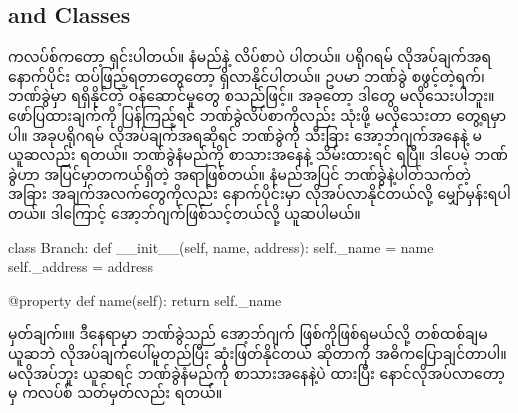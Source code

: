 \subsection*{ and  Classes}
 ကလပ်စ်ကတော့ ရှင်းပါတယ်။ နံမည်နဲ့ လိပ်စာပဲ ပါတယ်။ ပရိုဂရမ် လိုအပ်ချက်အရ နောက်ပိုင်း ထပ်ဖြည့်ရတာတွေတော့ ရှိလာနိုင်ပါတယ်။ ဥပမာ ဘဏ်ခွဲ စဖွင့်တဲ့ရက်၊ ဘဏ်ခွဲမှာ ရရှိနိုင်တဲ့ ဝန်ဆောင်မှုတွေ စသည်ဖြင့်။ အခုတော့ ဒါတွေ မလိုသေးပါဘူး။ ဖော်ပြထားချက်ကို ပြန်ကြည့်ရင် ဘဏ်ခွဲလိပ်စာကိုလည်း သုံးဖို့ မလိုသေးတာ တွေ့ရမှာပါ။ အခုပရိုဂရမ် လိုအပ်ချက်အရဆိုရင် ဘဏ်ခွဲကို သီးခြား အော့ဘ်ဂျက်အနေနဲ့ မယူဆလည်း ရတယ်။ ဘဏ်ခွဲနံမည်ကို စာသားအနေနဲ့ သိမ်းထားရင် ရပြီ။ ဒါပေမဲ့ ဘဏ်ခွဲဟာ အပြင်မှာတကယ်ရှိတဲ့ အရာဖြစ်တယ်။ နံမည်အပြင် ဘဏ်ခွဲနဲ့ပါတ်သက်တဲ့ အခြား အချက်အလက်တွေကိုလည်း နောက်ပိုင်းမှာ လိုအပ်လာနိုင်တယ်လို့ မျှော်မှန်းရပါတယ်။ ဒါကြောင့် အော့ဘ်ဂျက်ဖြစ်သင့်တယ်လို့ ယူဆပါမယ်။ 
%
\begin{py}
class Branch:
    def __init__(self, name, address):
        self._name = name
        self._address = address

    @property
    def name(self):
        return self._name
\end{py}
% 
မှတ်ချက်။\qquad ။ ဒီနေရာမှာ  ဘဏ်ခွဲသည် အော့ဘ်ဂျက် ဖြစ်ကိုဖြစ်ရမယ်လို့ တစ်ထစ်ချမယူဆဘဲ လိုအပ်\allowbreak ချက်ပေါ်မူတည်ပြီး ဆုံးဖြတ်နိုင်တယ် ဆိုတာကို အဓိကပြောချင်တာပါ။ မလိုအပ်ဘူး ယူဆရင် ဘဏ်ခွဲနံမည်ကို စာသားအနေနဲ့ပဲ ထားပြီး နောင်လိုအပ်လာတော့မှ ကလပ်စ် သတ်မှတ်လည်း ရတယ်။ 

